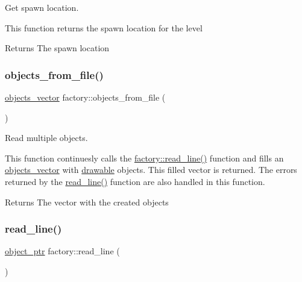 Get spawn location. 

This function returns the spawn location for the level

\begin{DoxyReturn}{Returns}
The spawn location 
\end{DoxyReturn}
\mbox{\label{classfactory_afb2fad4ac9b0f39b1bfc3f3fc8d218b6}} 
\subsubsection{\texorpdfstring{objects\+\_\+from\+\_\+file()}{objects\_from\_file()}}
{\footnotesize\ttfamily \hyperlink{drawable_8hpp_a6c0fdb1dfd0c34dbbdbb5dcd3c608b07}{objects\+\_\+vector} factory\+::objects\+\_\+from\+\_\+file (\begin{DoxyParamCaption}{ }\end{DoxyParamCaption})}



Read multiple objects. 

This function continuesly calls the \hyperlink{classfactory_a82385866bc910c1b3a3e82d56487dd24}{factory\+::read\+\_\+line()} function and fills an \hyperlink{drawable_8hpp_a6c0fdb1dfd0c34dbbdbb5dcd3c608b07}{objects\+\_\+vector} with \hyperlink{classdrawable}{drawable} objects. This filled vector is returned. The errors returned by the \hyperlink{classfactory_a82385866bc910c1b3a3e82d56487dd24}{read\+\_\+line()} function are also handled in this function. \begin{DoxyReturn}{Returns}
The vector with the created objects 
\end{DoxyReturn}
\mbox{\label{classfactory_a82385866bc910c1b3a3e82d56487dd24}} 
\subsubsection{\texorpdfstring{read\+\_\+line()}{read\_line()}}
{\footnotesize\ttfamily \hyperlink{drawable_8hpp_aab5add95f06d2ba25dbfed8eb07274fa}{object\+\_\+ptr} factory\+::read\+\_\+line (\begin{DoxyParamCaption}{ }\end{DoxyParamCaption})}



